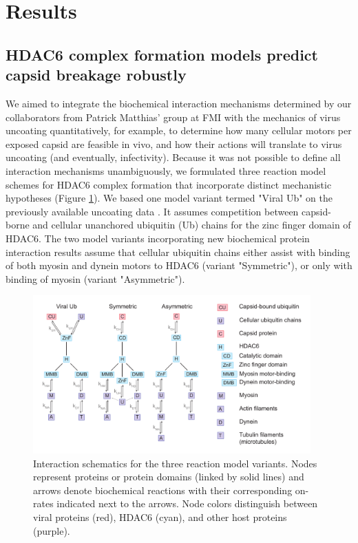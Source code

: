\section{Results}

\subsection{HDAC6 complex formation models predict capsid breakage robustly}

We aimed to integrate the biochemical interaction mechanisms determined by our collaborators from Patrick Matthias' group at FMI with the mechanics of virus uncoating quantitatively, for example, to determine how many cellular motors per exposed capsid are feasible in vivo, and how their actions will translate to virus uncoating (and eventually, infectivity). Because it was not possible to define all interaction mechanisms unambiguously, we formulated three reaction model schemes for HDAC6 complex formation that incorporate distinct mechanistic hypotheses (Figure \ref{figure:ReactionModelSchemes}). We based one model variant termed "Viral Ub" on the previously available uncoating data \cite{banerjee2014influenza}. It assumes competition between capsid-borne and cellular unanchored ubiquitin (Ub) chains for the zinc finger domain of HDAC6. The two model variants incorporating new biochemical protein interaction results assume that cellular ubiquitin chains either assist with binding of both myosin and dynein motors to HDAC6 (variant "Symmetric"), or only with binding of myosin (variant "Asymmetric").

\begin{figure}
\begin{center}
\includegraphics[width=0.95\textwidth, trim={0cm 0cm 0cm 0cm}, clip]{D_chapters/2_ReactionModel/ReactionModels.pdf}
\caption[Interaction schematics for the three reaction model variants]%
{Interaction schematics for the three reaction model variants. Nodes represent proteins or protein domains (linked by solid lines) and arrows denote biochemical reactions with their corresponding on-rates indicated next to the arrows. Node colors distinguish between viral proteins (red), HDAC6 (cyan), and other host proteins (purple).}
\label{figure:ReactionModelSchemes}
\end{center}
\end{figure}


